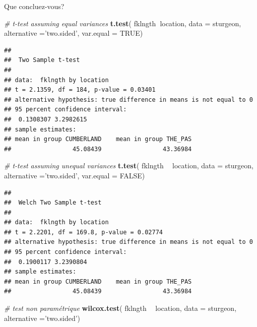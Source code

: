 \documentclass[12pt,]{book}
\newenvironment{Shaded}{\begin{snugshade}}{\end{snugshade}}
\newcommand{\CommentTok}[1]{\textcolor[rgb]{0.37,0.37,0.37}{\textit{#1}}}
\newcommand{\DataTypeTok}[1]{\textcolor[rgb]{0.27,0.27,0.27}{#1}}
\newcommand{\KeywordTok}[1]{\textcolor[rgb]{0.27,0.27,0.27}{\textbf{#1}}}
\newcommand{\NormalTok}[1]{#1}
\newcommand{\OperatorTok}[1]{\textcolor[rgb]{0.43,0.43,0.43}{\textbf{#1}}}
\newcommand{\OtherTok}[1]{\textcolor[rgb]{0.37,0.37,0.37}{#1}}
\newcommand{\StringTok}[1]{\textcolor[rgb]{0.5,0.5,0.5}{#1}}
\begin{document}
Que concluez-vous?

\begin{Shaded}
\begin{Highlighting}[]
\CommentTok{# t-test assuming equal variances}
 \KeywordTok{t.test}\NormalTok{(}
\NormalTok{   fklngth}\OperatorTok{~}\NormalTok{location, }\DataTypeTok{data =}\NormalTok{ sturgeon,}
   \DataTypeTok{alternative =}\StringTok{'two.sided'}\NormalTok{,}
   \DataTypeTok{var.equal =} \OtherTok{TRUE}\NormalTok{)}
\end{Highlighting}
\end{Shaded}

\begin{verbatim}
## 
## 	Two Sample t-test
## 
## data:  fklngth by location
## t = 2.1359, df = 184, p-value = 0.03401
## alternative hypothesis: true difference in means is not equal to 0
## 95 percent confidence interval:
##  0.1308307 3.2982615
## sample estimates:
## mean in group CUMBERLAND    mean in group THE_PAS 
##                 45.08439                 43.36984
\end{verbatim}

\begin{Shaded}
\begin{Highlighting}[]
\CommentTok{# t-test assuming unequal variances}
 \KeywordTok{t.test}\NormalTok{(}
\NormalTok{   fklngth }\OperatorTok{~}\StringTok{ }\NormalTok{location, }\DataTypeTok{data =}\NormalTok{ sturgeon,}
   \DataTypeTok{alternative =}\StringTok{'two.sided'}\NormalTok{,}
   \DataTypeTok{var.equal =} \OtherTok{FALSE}\NormalTok{)}
\end{Highlighting}
\end{Shaded}

\begin{verbatim}
## 
## 	Welch Two Sample t-test
## 
## data:  fklngth by location
## t = 2.2201, df = 169.8, p-value = 0.02774
## alternative hypothesis: true difference in means is not equal to 0
## 95 percent confidence interval:
##  0.1900117 3.2390804
## sample estimates:
## mean in group CUMBERLAND    mean in group THE_PAS 
##                 45.08439                 43.36984
\end{verbatim}

\begin{Shaded}
\begin{Highlighting}[]
\CommentTok{# test non paramétrique}
 \KeywordTok{wilcox.test}\NormalTok{(}
\NormalTok{   fklngth }\OperatorTok{~}\StringTok{ }\NormalTok{location, }\DataTypeTok{data =}\NormalTok{ sturgeon,}
   \DataTypeTok{alternative =}\StringTok{'two.sided'}\NormalTok{)}
\end{Highlighting}
\end{Shaded}
\end{document}
